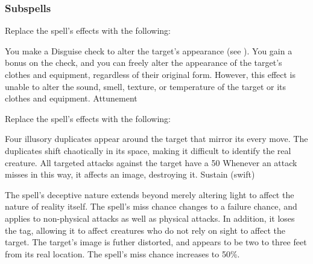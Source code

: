 \subsubsection{Subspells}
Replace the spell's effects with the following:
\begin{spellcontent}
\begin{augmenteffects}
\spelleffect
You make a Disguise check to alter the target's appearance (see ).
You gain a  bonus on the check, and you can freely alter the appearance of the target's clothes and equipment, regardless of their original form.
However, this effect is unable to alter the sound, smell, texture, or temperature of the target or its clothes and equipment.
\spelldur Attunement
\end{augmenteffects}
\end{spellcontent}
Replace the spell's effects with the following:
\begin{spellcontent}
\begin{augmenteffects}
\spelleffect
Four illusory duplicates appear around the target that mirror its every move.
The duplicates shift chaotically in its space, making it difficult to identify the real creature.
All targeted attacks against the target have a 50%
Whenever an attack misses in this way, it affects an image, destroying it.
\spelldur Sustain (swift)
\end{augmenteffects}
\end{spellcontent}
The spell's deceptive nature extends beyond merely altering light to affect the nature of reality itself.
The spell's miss chance changes to a failure chance, and applies to non-physical attacks as well as physical attacks.
In addition, it loses the  tag, allowing it to affect creatures who do not rely on sight to affect the target.
The target's image is futher distorted, and appears to be two to three feet from its real location.
The spell's miss chance increases to 50\%.
